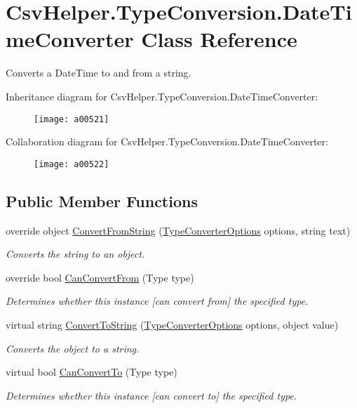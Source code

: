\hypertarget{a00084}{\section{Csv\-Helper.\-Type\-Conversion.\-Date\-Time\-Converter Class Reference}
\label{a00084}
}


Converts a Date\-Time to and from a string.  




Inheritance diagram for Csv\-Helper.\-Type\-Conversion.\-Date\-Time\-Converter\-:
\nopagebreak
\begin{figure}[H]
\begin{center}
\leavevmode
\texttt{[image: a00521]}
\end{center}
\end{figure}


Collaboration diagram for Csv\-Helper.\-Type\-Conversion.\-Date\-Time\-Converter\-:
\nopagebreak
\begin{figure}[H]
\begin{center}
\leavevmode
\texttt{[image: a00522]}
\end{center}
\end{figure}
\subsection*{Public Member Functions}
\begin{DoxyCompactItemize}
\item 
override object \hyperlink{a00084_a6b1b54cb2d1b200beb8fa3c63e4c064a}{Convert\-From\-String} (\hyperlink{a00178}{Type\-Converter\-Options} options, string text)
\begin{DoxyCompactList}\small\item\em Converts the string to an object. \end{DoxyCompactList}\item 
override bool \hyperlink{a00084_af44239d3bd014b1423fa80f7440bbd25}{Can\-Convert\-From} (Type type)
\begin{DoxyCompactList}\small\item\em Determines whether this instance \mbox{[}can convert from\mbox{]} the specified type. \end{DoxyCompactList}\item 
virtual string \hyperlink{a00088_a36cb2f9b24f15a671293f3a722324c27}{Convert\-To\-String} (\hyperlink{a00178}{Type\-Converter\-Options} options, object value)
\begin{DoxyCompactList}\small\item\em Converts the object to a string. \end{DoxyCompactList}\item 
virtual bool \hyperlink{a00088_acb65bd8c8199d88d5b1629ae35d18514}{Can\-Convert\-To} (Type type)
\begin{DoxyCompactList}\small\item\em Determines whether this instance \mbox{[}can convert to\mbox{]} the specified type. \end{DoxyCompactList}\end{DoxyCompactItemize}



